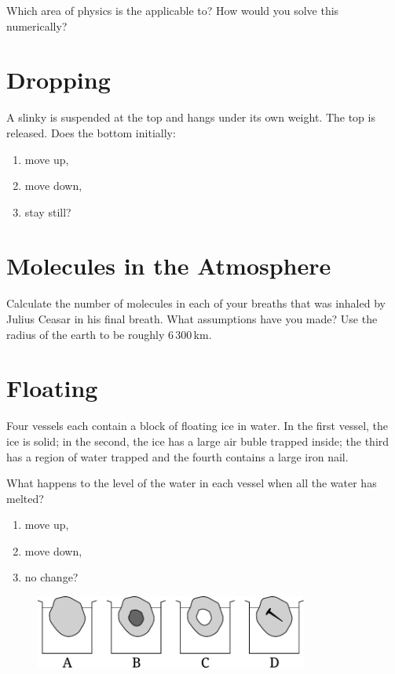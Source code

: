 Which area of physics is the applicable to? How would you solve this numerically?

\section{Dropping}
A slinky is suspended at the top and hangs under its own weight. The top is released. Does the bottom initially:
\begin{enumerate}[label=\alph*)]
	\item move up,
	\item move down,
	\item stay still?
\end{enumerate}

\section{Molecules in the Atmosphere}
Calculate the number of molecules in each of your breaths that was inhaled by Julius Ceasar in his final breath. What assumptions have you made? Use the radius of the earth to be roughly 6\,300\,km.

\section{Floating}
Four vessels each contain a block of floating ice in water. In the first vessel, the ice is solid; in the second, the ice has a large air buble trapped inside; the third has a region of water trapped and the fourth contains a large iron nail.

What happens to the level of the water in each vessel when all the water has melted?
\begin{enumerate}[label=\alph*)]
	\item move up,
	\item move down,
	\item no change?
\end{enumerate}
\begin{figure}[ht]
  \centering
  \includegraphics[width=0.8\textwidth]{vessels.pdf}
\end{figure}
